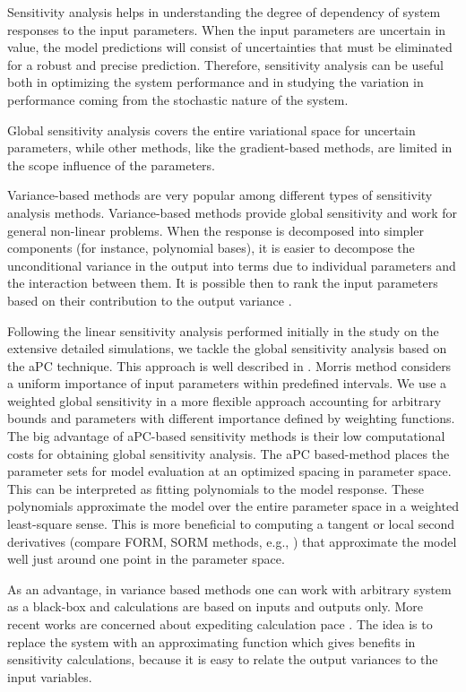 Sensitivity analysis helps in understanding the degree of dependency of system
responses to the input parameters. When the input parameters are uncertain in
value, the model predictions will consist of uncertainties that must be
eliminated for a robust and precise prediction. Therefore, sensitivity analysis
can be useful both in optimizing the system performance and in studying the
variation in performance coming from the stochastic nature of the system.

Global sensitivity analysis covers the entire variational space for uncertain
parameters, while other methods, like the gradient-based methods, are limited
in the scope influence of the parameters. 

Variance-based methods are very popular among different types of sensitivity
analysis methods. Variance-based methods provide global sensitivity and work
for general non-linear problems. When the response is decomposed into simpler
components (for instance, polynomial bases), it is easier to decompose the
unconditional variance in the output into terms due to individual parameters
and the interaction between them. It is possible then to rank the input
parameters based on their contribution to the output variance
\cite{saltelli2007global,reuter2008global}.

Following the linear sensitivity analysis performed initially in the study on
the extensive detailed simulations, we tackle the global sensitivity analysis
based on the aPC technique. This approach is well described in
\cite{oladyshkin2011concept,
OladNowakBarros_AWR2011}. Morris method \cite{Morris1991} considers a uniform
importance of input parameters within predefined intervals. We use a weighted
global sensitivity in a more flexible approach accounting for arbitrary bounds
and parameters with different importance defined by weighting functions. The
big advantage of aPC-based sensitivity methods is their low computational costs
for obtaining global sensitivity analysis. The aPC based-method
places the parameter sets for model evaluation at an optimized spacing in
parameter space. This can be interpreted as fitting polynomials to the model
response. These polynomials approximate the model over the entire parameter
space in a weighted least-square sense. This is more beneficial to computing a
tangent or local second derivatives (compare FORM, SORM methods, e.g.,
\cite{Jang1994}) that approximate the model well just around one point in the
parameter space.
 
As an advantage, in variance based methods one can work with arbitrary system as
a black-box and calculations are based on inputs and outputs only. More
recent works are concerned about expediting calculation pace
\cite{crestaux2009polynomial,oladyshkin2011concept, OladNowakBarros_AWR2011}.
The idea is to replace the system with an approximating function which gives
benefits in sensitivity calculations, because it is easy to relate the output
variances to
the input variables. 

